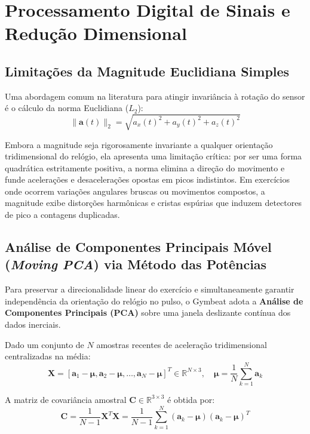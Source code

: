 \documentclass[12pt,openany,oneside,a4paper,english,brazil]{abntex2}
\begin{document}
\section{Processamento Digital de Sinais e Redução Dimensional}

\subsection{Limitações da Magnitude Euclidiana Simples}
Uma abordagem comum na literatura para atingir invariância à rotação do sensor é o cálculo da norma Euclidiana ($L_2$):
\begin{equation}
    \|\mathbf{a}(t)\|_2 = \sqrt{a_x(t)^2 + a_y(t)^2 + a_z(t)^2}
\end{equation}

Embora a magnitude seja rigorosamente invariante a qualquer orientação tridimensional do relógio, ela apresenta uma limitação crítica: por ser uma forma quadrática estritamente positiva, a norma elimina a direção do movimento e funde acelerações e desacelerações opostas em picos indistintos. Em exercícios onde ocorrem variações angulares bruscas ou movimentos compostos, a magnitude exibe distorções harmônicas e cristas espúrias que induzem detectores de pico a contagens duplicadas.

\subsection{Análise de Componentes Principais Móvel (\textit{Moving PCA}) via Método das Potências}
Para preservar a direcionalidade linear do exercício e simultaneamente garantir independência da orientação do relógio no pulso, o Gymbeat adota a \textbf{Análise de Componentes Principais (PCA)} sobre uma janela deslizante contínua dos dados inerciais.

Dado um conjunto de $N$ amostras recentes de aceleração tridimensional centralizadas na média:
\begin{equation}
    \mathbf{X} = [\mathbf{a}_1 - \boldsymbol{\mu}, \mathbf{a}_2 - \boldsymbol{\mu}, \dots, \mathbf{a}_N - \boldsymbol{\mu}]^T \in \mathbb{R}^{N \times 3}, \quad \boldsymbol{\mu} = \frac{1}{N} \sum_{k=1}^N \mathbf{a}_k
\end{equation}

A matriz de covariância amostral $\mathbf{C} \in \mathbb{R}^{3 \times 3}$ é obtida por:
\begin{equation}
    \mathbf{C} = \frac{1}{N-1} \mathbf{X}^T \mathbf{X} = \frac{1}{N-1} \sum_{k=1}^N (\mathbf{a}_k - \boldsymbol{\mu})(\mathbf{a}_k - \boldsymbol{\mu})^T
\end{equation}
\end{document}
